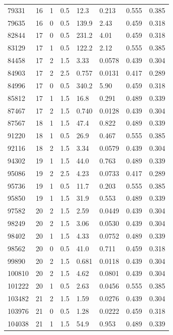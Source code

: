 \documentclass[preview]{standalone}
\begin{document}
{{{\begin{tabular}{L{1.2cm}C{1.2cm} C{0.3cm}C{0.5cm} C{1.4cm}C{1.4cm} C{1.4cm}C{1.4cm}}
  79331  &    16  & 1     & 0.5 &  12.3  & 0.213  & 0.555 &  0.385   \\ 
  79635  &    16  & 0     & 0.5 &  139.9  & 2.43  & 0.459 &  0.318   \\ 
  82844  &    17  & 0     & 0.5 &  231.2  & 4.01  & 0.459 &  0.318   \\ 
  83129  &    17  & 1     & 0.5 &  122.2  & 2.12  & 0.555 &  0.385   \\ 
  84458  &    17  & 2     & 1.5 &  3.33  & 0.0578  & 0.439 &  0.304   \\ 
  84903  &    17  & 2     & 2.5 &  0.757  & 0.0131  & 0.417 &  0.289   \\ 
  84996  &    17  & 0     & 0.5 &  340.2  & 5.90  & 0.459 &  0.318   \\ 
  85812  &    17  & 1     & 1.5 &  16.8  & 0.291  & 0.489 &  0.339   \\ 
  87467  &    17  & 2     & 1.5 &  0.740  & 0.0128  & 0.439 &  0.304   \\ 
  87567  &    18  & 1     & 1.5 &  47.4  & 0.822  & 0.489 &  0.339   \\ 
  91220  &    18  & 1     & 0.5 &  26.9  & 0.467  & 0.555 &  0.385   \\ 
  92116  &    18  & 2     & 1.5 &  3.34  & 0.0579  & 0.439 &  0.304   \\ 
  94302  &    19  & 1     & 1.5 &  44.0  & 0.763  & 0.489 &  0.339   \\ 
  95086  &    19  & 2     & 2.5 &  4.23  & 0.0733  & 0.417 &  0.289   \\ 
  95736  &    19  & 1     & 0.5 &  11.7  & 0.203  & 0.555 &  0.385   \\ 
  95850  &    19  & 1     & 1.5 &  31.9  & 0.553  & 0.489 &  0.339   \\ 
  97582  &    20  & 2     & 1.5 &  2.59  & 0.0449  & 0.439 &  0.304   \\ 
  98249  &    20  & 2     & 1.5 &  3.06  & 0.0530  & 0.439 &  0.304   \\ 
  98402  &    20  & 1     & 1.5 &  4.33  & 0.0752  & 0.489 &  0.339   \\ 
  98562  &    20  & 0     & 0.5 &  41.0  & 0.711  & 0.459 &  0.318   \\ 
  99890  &    20  & 2     & 1.5 &  0.681  & 0.0118  & 0.439 &  0.304   \\ 
  100810  &    20  & 2     & 1.5 &  4.62  & 0.0801  & 0.439 &  0.304   \\ 
  101222  &    20  & 1     & 0.5 &  2.63  & 0.0456  & 0.555 &  0.385   \\ 
  103482  &    21  & 2     & 1.5 &  1.59  & 0.0276  & 0.439 &  0.304   \\ 
  103976  &    21  & 0     & 0.5 &  1.28  & 0.0222  & 0.459 &  0.318   \\ 
  104038  &    21  & 1     & 1.5 &  54.9  & 0.953  & 0.489 &  0.339   \\ 
\hline 
\end{tabular} 

}}}
\end{document}
